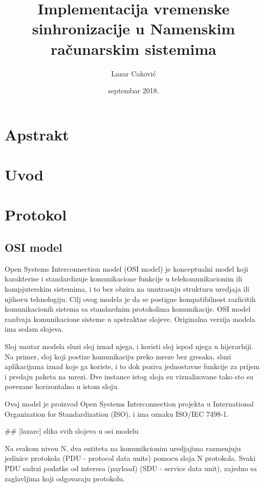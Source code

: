 \documentclass[a4paper,12pt, master]{etf}
\title{Implementacija vremenske sinhronizacije u Namenskim ra\v{c}unarskim sistemima}
\author{Lazar Caković}
\date{septembar 2018.}
\begin{document}
	\maketitle

	\tableofcontents

	\listoffigures

	\newpage

	\chapter{Apstrakt}

	\newpage

	\chapter{Uvod}

	\newpage

	\chapter{Protokol}

	\section{OSI model}

	Open Systems Interconnection model (OSI model) je konceptualni model koji karakterise i
	standardizuje komunikacione funkcije u telekomunikacionim ili kompjuterskim sistemima, i 
	to bez obzira na unutrasnju strukturu uredjaja ili njihovu tehnologiju. Cilj ovog modela 
	je da se postigne kompatibilnost razlicitih komunikacionih sistema sa standardnim 
	protokolima komunikacije. OSI model razdvaja komunikacione sisteme u apstraktne slojeve. 
	Originalna verzija modela ima sedam slojeva.

	Sloj unutar modela sluzi sloj iznad njega, i koristi sloj ispod njega u hijerarhiji. Na 
	primer, sloj koji postize komunikaciju preko mreze bez gresaka, sluzi aplikacijama iznad 
	koje ga koriste, i to dok poziva jednostavne funkcije za prijem i predaju paketa na mrezi. 
	Dve instance istog sloja su vizualizovane tako sto su povezane horizontalno u istom sloju.

	Ovaj model je proizvod Open Systems Interconnection projekta u International Organization 
	for Standardization (ISO), i ima oznaku ISO/IEC 7498-1.

	\#\# [lazarc] slika svih slojeva u osi modelu

	Na svakom nivou N, dva entiteta na komunikcionim uredjajima razmenjuju jedinice protokola 
	(PDU - protocol data units) pomocu sloja N protokola. Svaki PDU sadrzi podatke od interesa 
	(payload) (SDU - service data unit), zajedno sa zaglavljima koji odgovaraju protokolu.
\end{document}
